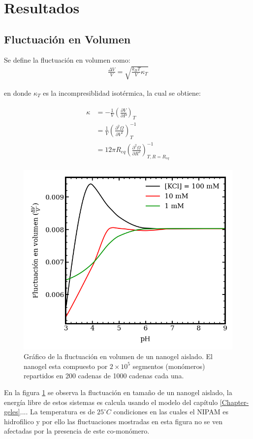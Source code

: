 \section{Resultados}


\subsection{Fluctuaci\'on en Volumen}
Se define la fluctuaci\'on en volumen como:
\begin{align}
	\frac{\Delta V}{V} = \sqrt{\frac{k_BT}{V}\kappa_T}
\end{align}

\noindent en donde $\kappa_T$ es la incompresiblidad isot\'ermica, la cual se obtiene:

\begin{align}
	\begin{aligned}
		\kappa & = -\frac{1}{V} \left( \frac{\partial V}{\partial P}\right)_T \\
		& =\frac{1}{V} \left( \frac{\partial^2 \Omega}{\partial V^2}\right)^{-1}_T \\
		& = 12 \pi R_{eq} \left( \frac{\partial^2 \Omega}{\partial R^2}\right)^{-1}_{T,R=R_{eq}}
	\end{aligned}
\end{align}



\begin{figure}[!tb]
	\centering
	\includegraphics[width=1\linewidth]{Figures/graph-mc/dvv.png}
	\caption{Gr\'afico de la fluctuaci\'on en volumen de un nanogel aislado. El nanogel esta compuesto por $2\times 10^5$ segmentos (mon\'omeros) repartidos en 200 cadenas de 1000 cadenas cada una.}
	\label{fig:mc:dvvi}
\end{figure}
En la figura \ref{fig:mc:dvvi} se observa la fluctuaci\'on en tama\~no de un nanogel aislado, la energ\'ia libre de estos sistemas es calcula usando el modelo del cap\'itulo \ref{Chapter-geles}....
La temperatura es de $25 ^\circ C$ condiciones en las cuales el NIPAM es hidrofilico y por ello las fluctuaciones mostradas en esta figura no se ven afectadas por la presencia de este co-mon\'omero.

